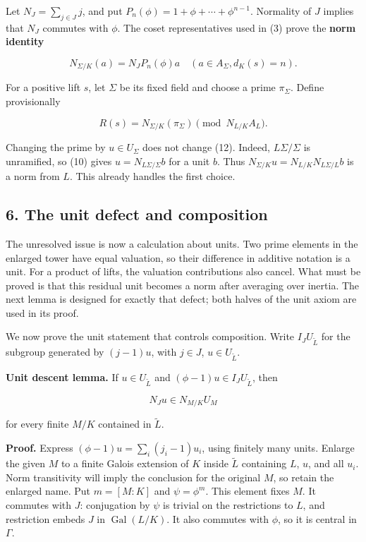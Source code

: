 \documentclass[11pt,a4paper]{article}
\begin{document}
Let \(N_J=\sum_{j\in J}j\), and put
\(P_n(\phi)=1+\phi+\cdots+\phi^{n-1}\). Normality of \(J\) implies that
\(N_J\) commutes with \(\phi\). The coset representatives used in (3)
prove the \textbf{norm identity}

\[
N_{\Sigma/K}(a)=N_JP_n(\phi)a
\quad(a\in A_\Sigma, d_K(s)=n).
\tag{11}
\]

For a positive lift \(s\), let \(\Sigma\) be its fixed field and choose
a prime \(\pi_\Sigma\). Define provisionally

\[
R(s)=N_{\Sigma/K}(\pi_\Sigma)\pmod{N_{L/K}A_L}.
\tag{12}
\]

Changing the prime by \(u\in U_\Sigma\) does not change (12). Indeed,
\(L\Sigma/\Sigma\) is unramified, so (10) gives
\(u=N_{L\Sigma/\Sigma}b\) for a unit \(b\). Thus
\(N_{\Sigma/K}u=N_{L/K}N_{L\Sigma/L}b\) is a norm from \(L\). This
already handles the first choice.

\subsection{6. The unit defect and
composition}\label{the-unit-defect-and-composition}

The unresolved issue is now a calculation about units. Two prime
elements in the enlarged tower have equal valuation, so their difference
in additive notation is a unit. For a product of lifts, the valuation
contributions also cancel. What must be proved is that this residual
unit becomes a norm after averaging over inertia. The next lemma is
designed for exactly that defect; both halves of the unit axiom are used
in its proof.

We now prove the unit statement that controls composition. Write
\(I_JU_{\widetilde L}\) for the subgroup generated by \((j-1)u\), with
\(j\in J\), \(u\in U_{\widetilde L}\).

\textbf{Unit descent lemma.} If \(u\in U_{\widetilde L}\) and
\((\phi-1)u\in I_JU_{\widetilde L}\), then

\[
N_Ju\in N_{M/K}U_M
\]

for every finite \(M/K\) contained in \(\widetilde L\).

\textbf{Proof.} Express \((\phi-1)u=\sum_i(j_i-1)u_i\), using finitely
many units. Enlarge the given \(M\) to a finite Galois extension of
\(K\) inside \(\widetilde L\) containing \(L\), \(u\), and all \(u_i\).
Norm transitivity will imply the conclusion for the original \(M\), so
retain the enlarged name. Put \(m=[M:K]\) and \(\psi=\phi^m\). This
element fixes \(M\). It commutes with \(J\): conjugation by \(\psi\) is
trivial on the restrictions to \(L\), and restriction embeds \(J\) in
\(\operatorname{Gal}(L/K)\). It also commutes with \(\phi\), so it is
central in \(\Gamma\).
\end{document}
